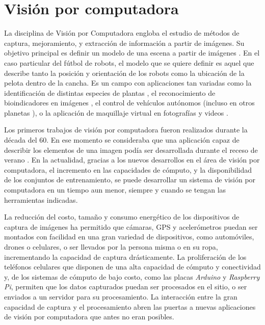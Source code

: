 
\section{Visión por computadora}

La disciplina de Visión por Computadora engloba el estudio de métodos de
captura, mejoramiento, y extracción de información a partir de imágenes. Su
objetivo principal es definir un modelo de una escena a partir de imágenes
\cite{cvLinda2001}. En el caso particular del fútbol de robots, el modelo que se
quiere definir es aquel que describe tanto la posición y orientación de los
robots como la ubicación de la pelota dentro de la cancha. Es un campo con
aplicaciones tan variadas como la identificación de distintas especies de
plantas \cite{plantIdentificacionUCVT2018}, el reconocimiento de bioindicadores
en imágenes \cite{anurosEmImagm2016}, el control de vehículos autónomos
\cite{e2eLearning4SDC} (incluso en otros planetas
\cite{twoYearsMarsRovers2007}), o la aplicación de maquillaje virtual en
fotografías y videos \cite{virtualMakeup2015}.

Los primeros trabajos de visión por computadora fueron realizados durante la
década del 60. En ese momento se consideraba que una aplicación capaz de
describir los elementos de una imagen podía ser desarrollada durante el receso
de verano \cite{summerVisionProject1966}. En la actualidad, gracias a los nuevos
desarrollos en el área de visión por computadora, el incremento en las
capacidades de cómputo, y la disponibilidad de los conjuntos de entrenamiento,
se puede desarrollar un sistema de visión por computadora en un tiempo aun
menor, siempre y cuando se tengan las herramientas indicadas.

La reducción del costo, tamaño y consumo energético de los dispositivos de
captura de imágenes ha permitido que cámaras, GPS y acelerómetros puedan ser
montados con facilidad en una gran variedad de dispositivos, como automóviles,
drones o celulares, o ser llevados por la persona misma o en su ropa,
incrementando la capacidad de captura drásticamente. La proliferación de los
teléfonos celulares que disponen de una alta capacidad de cómputo y conectividad
y, de los sistemas de cómputo de bajo costo, como las placas \emph{Arduino} y
\emph{Raspberry Pi}, permiten que los datos capturados puedan ser procesados en
el sitio, o ser enviados a un servidor para su procesamiento. La interacción
entre la gran capacidad de captura y el procesamiento abren las puertas a nuevas
aplicaciones de visión por computadora que antes no eran posibles.

